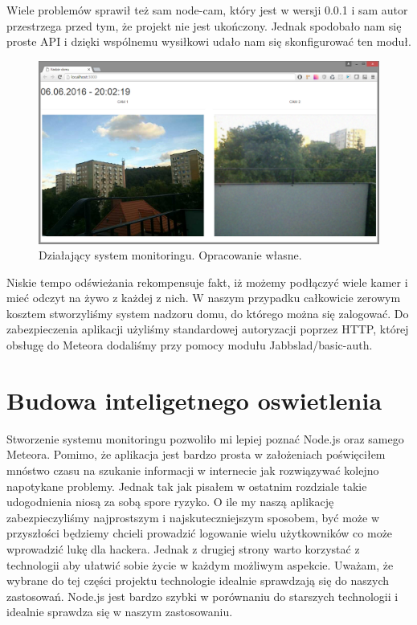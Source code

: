 \documentclass[brudnopis]{xmgr}
\begin{document}
Wiele problemów sprawił też sam node-cam, który jest w wersji 0.0.1 i sam autor przestrzega przed tym, że projekt nie jest ukończony. Jednak spodobało nam się proste API i dzięki wspólnemu wysiłkowi udało nam się skonfigurować ten moduł.
\begin{figure}[h]
\centering
\includegraphics[width=12cm]{m_cam}
\caption{Działający system monitoringu. Opracowanie własne.}
\label{fig:cam}
\end{figure} 

Niskie tempo odświeżania rekompensuje fakt, iż możemy podłączyć wiele kamer i mieć odczyt na żywo z każdej z nich. W naszym przypadku całkowicie zerowym kosztem stworzyliśmy system nadzoru domu, do którego można się zalogować. Do zabezpieczenia aplikacji użyliśmy standardowej autoryzacji poprzez HTTP, której obsługę do Meteora dodaliśmy przy pomocy modułu Jabbslad/basic-auth.

\section{Budowa inteligetnego oswietlenia}


\summary
Stworzenie systemu monitoringu pozwoliło mi lepiej poznać Node.js oraz samego Meteora. Pomimo, że aplikacja jest bardzo prosta w założeniach poświęciłem mnóstwo czasu na szukanie informacji w internecie jak rozwiązywać kolejno napotykane problemy. Jednak tak jak pisałem w ostatnim rozdziale takie udogodnienia niosą za sobą spore ryzyko. O ile my naszą aplikację zabezpieczyliśmy najprostszym i najskuteczniejszym sposobem, być może w przyszłości będziemy chcieli prowadzić logowanie wielu użytkowników co może wprowadzić lukę dla hackera. Jednak z drugiej strony warto korzystać z technologii aby ułatwić sobie życie w każdym możliwym aspekcie. 
Uważam, że wybrane do tej części projektu technologie idealnie sprawdzają się do naszych zastosowań. Node.js jest bardzo szybki w porównaniu do starszych technologii i idealnie sprawdza się w naszym zastosowaniu.
	
\end{document}
